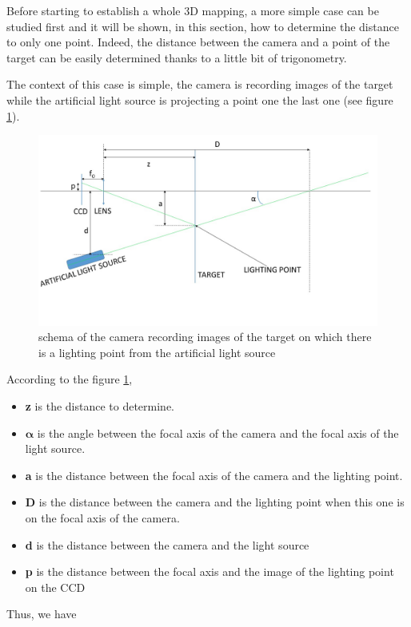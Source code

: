 Before starting to establish a whole 3D mapping, a more simple case can be studied first and it will be shown, in this section, how to determine the distance to only one point. Indeed, the distance between the camera and a point of the target can be easily determined thanks to a little bit of trigonometry.

The context of this case is simple, the camera is recording images of the target while the artificial light source is projecting a point one the last one (see figure \ref{fig:schema1D}).

\begin{figure}[h]
  \centerline{\includegraphics[scale=0.5]{fig/schema1D.jpg}}
  \caption{schema of the camera recording images of the target on which there is a lighting point from the artificial light source}
  \label{fig:schema1D}
\end{figure}

According to the figure \ref{fig:schema1D}, 
\begin{itemize}
\item \textbf{z} is the distance to determine.
\item $\bm{\alpha}$ is the angle between the focal axis of the camera and the focal axis of the light source.
\item \textbf{a} is the distance between the focal axis of the camera and the lighting point.
\item \textbf{D} is the distance between the camera and the lighting point when this one is on the focal axis of the camera.
\item \textbf{d} is the distance between the camera and the light source
\item \textbf{p} is the distance between the focal axis and the image of the lighting point on the CCD
\end{itemize}
Thus, we have

